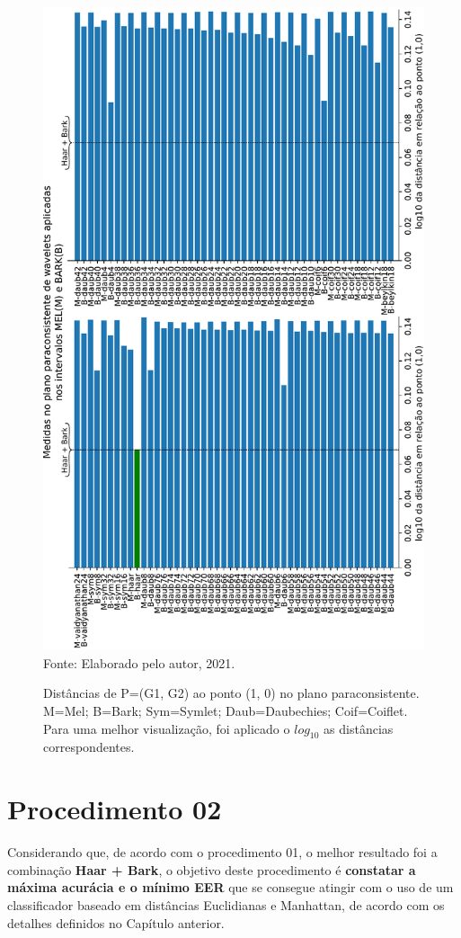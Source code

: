 	\newpage
	\begin{landscape}
		\begin{figure}[h]
			\centering
			\caption{Distâncias de P=(G1, G2) ao ponto (1, 0) no plano paraconsistente. M=Mel; B=Bark; Sym=Symlet; Daub=Daubechies; Coif=Coiflet. Para uma melhor visualização, foi aplicado o $log_{10}$ as distâncias correspondentes.}
			\includegraphics[width=0.6\linewidth,angle=-90]{images/results/paraconsistentPlane/ParaconsistentFull.pdf}
			\label{fig:paraconsistentfull}
			\\Fonte: Elaborado pelo autor, 2021.
		\end{figure}
	\end{landscape}
	\newpage
	
	\FloatBarrier
	
	
	\disableClearpage
	
	\section{Procedimento 02} \label{chap:testsResults:sec:Experimento02}
		\enableClearpage
	
		\par Considerando que, de acordo com o procedimento 01, o melhor resultado foi a combinação \textbf{Haar + Bark}, o objetivo deste procedimento é \textbf{constatar a máxima acurácia e o mínimo EER} que se consegue atingir com o uso de um classificador baseado em distâncias Euclidianas e Manhattan, de acordo com os detalhes definidos no Capítulo anterior.
		
